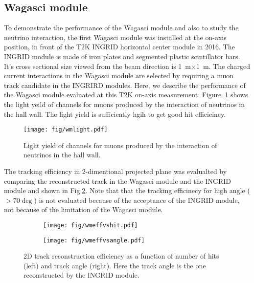 \subsection{Wagasci module}
To demonstrate the performance of the Wagasci module and also to study the neutrino interaction,
the first Wagasci module was installed at the on-axis position, in front of the T2K INGRID horizontal center module
in 2016.
The INGRID module is made of iron plates and segmented plastic scintillator bars.
It's cross sectional size viewed from the beam direction is 1~m$\times$1~m.
The charged current interactions in the Wagasci module are selected by requiring a muon track candidate
in the INGRIRD modules.
Here, we describe the performance of the Wagasci module evaluated at this T2K on-axis measurement.
Figure~\ref{fig:wmlight} shows the light yeild of channels for muons produced by the interaction of neutrinos
in the hall wall.
The light yield is sufficiently hgih to get good hit efficieincy.  
\begin{figure}[tbh]
\begin{center}
\texttt{[image: fig/wmlight.pdf]}
\end{center}
\caption{Light yield of channels for muons produced by the interaction of neutrinos
  in the hall wall.
}
\label{fig:wmlight}
\end{figure}
The tracking efficiency in 2-dimentional projected plane was evalualted by comparing the reconstructed track
in the Wagasci module and the INGRID module and shown in Fig.\ref{fig:wmefficiency}.
Note that that the tracking efficinecy for high angle ($>70\deg$) is not evaluated because of the acceptance
of the INGRID module, not because of the limitation of the Wagasci module.
\begin{figure}[tbh]
  \begin{center}
   \begin{subfigure}{0.48\textwidth}
     \texttt{[image: fig/wmeffvshit.pdf]}
    \end{subfigure}
  \begin{subfigure}{0.48\textwidth}
      \texttt{[image: fig/wmeffvsangle.pdf]}
    \end{subfigure}    
    \end{center}
  \caption{2D track reconstruction efficiency as a function of number of hits (left) and track angle (right).
  Here the track angle is the one reconstructed by the INGRID module.}
\label{fig:wmefficiency}
\end{figure}


